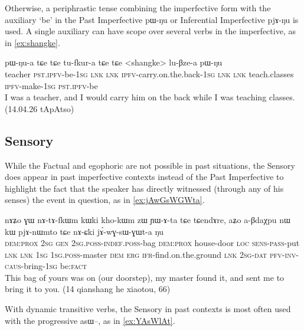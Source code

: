 \documentclass[oldfontcommands,oneside,a4paper,11pt]{article}
\newcommand{\ipa}[1]{{\phon \mbox{#1}}} %
\newcommand{\factual}[1]{\textsc{:fact}}
\begin{document}
Otherwise, a periphrastic tense combining the imperfective form with the auxiliary `be' in the Past Imperfective \ipa{pɯ-ŋu} or Inferential Imperfective \ipa{pjɤ-ŋu}  is used.   A single auxiliary  can have scope over several verbs in the imperfective, as in \ref{ex:shangke}.

\begin{exe}
\ex \label{ex:shangke}
\gll  \ipa{sloχpɯn} 	\ipa{pɯ-ŋu-a} 	\ipa{tɕe} 	\ipa{tɕe} 	\ipa{tu-fkur-a} 	\ipa{tɕe} 	\ipa{tɕe} 	 <shangke> 	\ipa{lu-βze-a} 	\ipa{pɯ-ŋu} \\
teacher \textsc{pst.ipfv}-be-\textsc{1sg} \textsc{lnk}  \textsc{lnk} \textsc{ipfv}-carry.on.the.back-\textsc{1sg} \textsc{lnk}  \textsc{lnk}  teach.classes \textsc{ipfv}-make-\textsc{1sg} \textsc{pst.ipfv}-be \\
\glt I was a teacher, and I would carry him on the back while I was teaching classes. (14.04.26 tApAtso)
\end{exe}


\subsection{Sensory}  \label{sec:pst:sens}
While the Factual and egophoric are not possible in past situations, the Sensory does appear in past imperfective contexts instead of the Past Imperfective to highlight the fact that the speaker  has directly witnessed (through any of his senses) the event in question, as in \ref{ex:jAwGsWGWta}. 

\begin{exe}
\ex \label{ex:jAwGsWGWta}
\gll  \ipa{kɯki} 	\ipa{nɤʑo} 	\ipa{ɣɯ} 	\ipa{nɤ-tɤ-fkɯm} 	\ipa{kɯki} 	\ipa{kho-kɯm} 	\ipa{zɯ} 	\ipa{ɲɯ-ɤ-ta} 	\ipa{tɕe} 	\ipa{tɕendɤre,} \ipa{aʑo} 	\ipa{a-βdaχpu} 	\ipa{nɯ} 	\ipa{kɯ} 	\ipa{pjɤ-nɯmto} 	\ipa{tɕe} 	\ipa{nɤ-ɕki} 	\ipa{jɤ́-wɣ-sɯ-ɣɯt-a} 	\ipa{ŋu}  \\
 \textsc{dem:prox}  \textsc{2sg} \textsc{gen} \textsc{2sg.poss-indef.poss}-bag \textsc{dem:prox} house-door \textsc{loc} \textsc{sens-pass}-put \textsc{lnk} \textsc{lnk} \textsc{1sg} \textsc{1sg.poss}-master \textsc{dem} \textsc{erg} \textsc{ifr}-find.on.the.ground  \textsc{lnk} \textsc{2sg-dat} \textsc{pfv-inv-caus}-bring-\textsc{1sg} be\factual{} \\
\glt This bag of yours was on (our doorstep), my master found it, and sent me to bring it to you. (14 qianshang he xiaotou, 66)
\end{exe}

With dynamic transitive verbs, the Sensory in past contexts is most often used with the progressive \ipa{asɯ--}, as in \ref{ex:YAsWlAt}.
\end{document}
